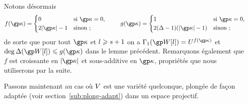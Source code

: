Notons désormais
\begin{equation} \label{e:def-f-g}
  f(\derp) =
  \begin{cases*}
    0                               & si \( \derp = 0 \), \\
    2\lgr\derp - 1                  & sinon ;
  \end{cases*}
  \qquad
  g(\derp) =
  \begin{cases*}
    1                               & si \( \derp = 0 \), \\
    2 (\anydeg - 1) (\lgr\derp - 1) & sinon ;
  \end{cases*}
\end{equation}
de sorte que pour tout \( \derp \) et \( l \geqslant s + 1 \) on a
\( \pmden_1(\anyvp[\indi]) = \pden^{f(\derp)} \) et
\( \deg \pmnum(\anyvp[\indi]) \le g(\derp) \) dans le lemme précédent.
Remarquons également que \( f \) est croissante en \( \lgr\derp \) et
sous-additive en \( \derp \), propriétés que nous utiliserons par la suite.

Passons maintenant au cas où \( V \) est une variété quelconque, plongée
de façon adaptée (voir section~\ref{sub:plong-adapt}) dans un espace
projectif.

